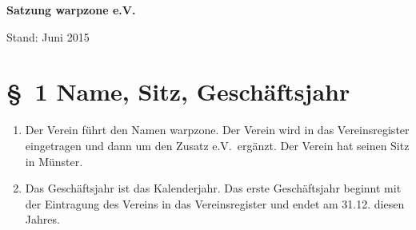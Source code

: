 \documentclass[11pt,DIV12]{scrartcl}
\begin{document}
\begin{center}
\Huge
\textbf{Satzung warpzone e.V.}

\vspace{4mm}
\noindent
\Large
Stand: Juni 2015
\end{center}

\vspace{2mm}
\normalsize
\section*{§~1 Name, Sitz, Geschäftsjahr}
\begin{enumerate}
\item Der Verein führt den Namen \glqq warpzone\grqq . Der Verein wird in das Vereinsregister eingetragen und dann um den Zusatz \glqq e.V.\grqq\ ergänzt. Der Verein hat seinen Sitz in Münster.
\item Das Geschäftsjahr ist das Kalenderjahr. Das erste Geschäftsjahr beginnt mit der Eintragung des Vereins in das Vereinsregister und endet am 31.12. diesen Jahres.
\end{enumerate}
\end{document}
